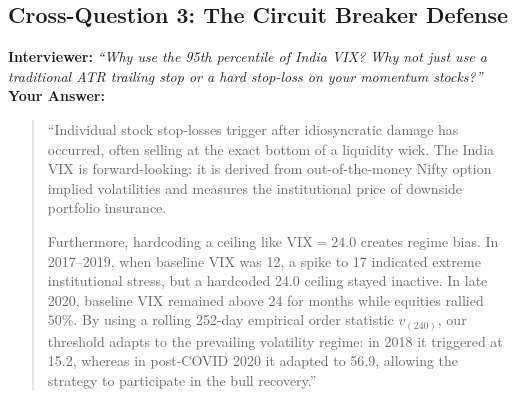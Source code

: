 \documentclass[11pt,a4paper]{article}
\begin{document}
\subsection{Cross-Question 3: The Circuit Breaker Defense}
\textbf{Interviewer:} \textit{``Why use the 95th percentile of India VIX? Why not just use a traditional ATR trailing stop or a hard stop-loss on your momentum stocks?''} \\
\textbf{Your Answer:}
\begin{quote}
``Individual stock stop-losses trigger after idiosyncratic damage has occurred, often selling at the exact bottom of a liquidity wick. The India VIX is forward-looking: it is derived from out-of-the-money Nifty option implied volatilities and measures the institutional price of downside portfolio insurance.

Furthermore, hardcoding a ceiling like $\text{VIX} = 24.0$ creates regime bias. In 2017--2019, when baseline VIX was 12, a spike to 17 indicated extreme institutional stress, but a hardcoded 24.0 ceiling stayed inactive. In late 2020, baseline VIX remained above 24 for months while equities rallied $50\%$. By using a rolling 252-day empirical order statistic $v_{(240)}$, our threshold adapts to the prevailing volatility regime: in 2018 it triggered at 15.2, whereas in post-COVID 2020 it adapted to 56.9, allowing the strategy to participate in the bull recovery.''
\end{quote}
\end{document}
